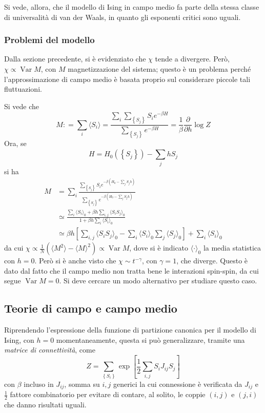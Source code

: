 \documentclass[11pt, a4paper]{scrartcl}
\theoremstyle{style}
\theoremstyle{style1}
\numberwithin{equation}{subsection}
\begin{document}
Si vede, allora, che il modello di Ising in campo medio fa parte della stessa classe di universalit\`a di van der Waals, in quanto gli esponenti critici sono uguali.
\subsubsection{Problemi del modello}
Dalla sezione precedente, si \`e evidenziato che $\chi $ tende a divergere. 
Per\`o, $\chi  \propto \operatorname{Var} M$, con $M$ magnetizzazione del sistema; questo \`e un problema perch\'e l'approssimazione di campo medio \`e basata proprio sul considerare piccole tali fluttuazioni.

Si vede che
\[
M : = \sum_{i}^{} \langle S_i \rangle = \frac{\sum_{i}^{} \sum_{\left\{ S_j \right\} } S_i e^{-\beta H} }{\sum_{\left\{ S_j \right\} }^{} e^{-\beta H}} = \frac{1}{\beta } \frac{\partial }{\partial h} \log Z
\] 
Ora, se 
\[
H = H_0\left(\left\{ S_j \right\} \right) - \sum_{j}^{} h S_j
\] 
si ha
\[
	\begin{split}
		M &= \sum_{i}^{} \frac{\sum_{\left\{ S_j \right\} }^{} S_i e^{-\beta (H_0-\sum_{j}^{} S_jh)}}{\sum_{\left\{ S_j \right\} }^{} e^{-\beta (H_0-\sum_{j}^{} S_j h )}}\\
		  &\simeq \frac{\sum_{i}^{} \langle S_i \rangle_0 + \beta h \sum_{i,j}^{} \langle S_iS_j \rangle_0}{1 + \beta h \sum_{i}^{} \langle S_i \rangle_0}\\
		  &\simeq \beta h \left[ \sum_{i,j}^{} \langle S_iS_j \rangle_0 - \sum_{i}^{} \langle S_i \rangle_0 \sum_{j}^{} \langle S_j \rangle_0 \right]  + \sum_{i}^{} \langle S_i \rangle_0
	\end{split}
\] 
da cui $\chi \propto \frac{1}{N} \left(\langle M^2 \rangle-\langle M \rangle^2\right) \propto \operatorname{Var} M$, dove si \`e indicato $\langle \cdot  \rangle_0$ la media statistica con $h=0$.
Per\`o si \`e anche visto che $\chi \sim t ^{-\gamma}$, con $\gamma=1$, che diverge. 
Questo \`e dato dal fatto che il campo medio non tratta bene le interazioni spin-spin, da cui segue $\operatorname{Var} M = 0$.
Si deve cercare un modo alternativo per studiare questo caso.

\subsection{Teorie di campo e campo medio}
Riprendendo l'espressione della funzione di partizione canonica per il modello di Ising, con $h=0 $ momentaneamente, questa si pu\`o generalizzare, tramite una \textit{matrice di connettivit\`a}, come
\[
Z = \sum_{\left\{ S_i \right\} }^{} \exp \left[ \frac{1}{2}\sum_{i,j}^{} S_i J_{ij} S_j \right] 
\] 
con $\beta $ incluso in $J_{ij} $, somma su $i,j$ generici la cui connessione \`e verificata da $J_{ij} $ e $\frac{1}{2}$ fattore combinatorio per evitare di contare, al solito, le coppie $(i,j)$ e $(j,i)$ che danno risultati uguali.
\end{document}
